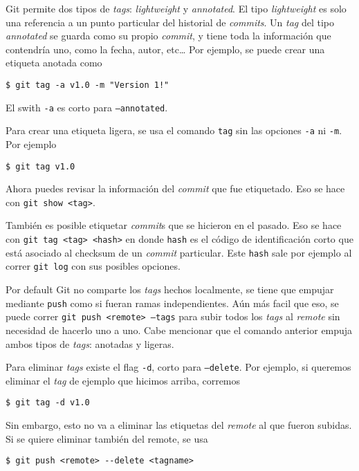 \documentclass[spanish, 12pt, a4paper]{article}
\begin{document}
Git permite dos tipos de \textit{tags}: \textit{lightweight} y
\textit{annotated}.
El tipo \textit{lightweight} es solo una referencia a un punto particular del
historial de \textit{commits}.
Un \textit{tag} del tipo \textit{annotated} se guarda como su propio
\textit{commit}, y tiene toda la información que contendría uno, como la fecha,
autor, etc\dots
Por ejemplo, se puede crear una etiqueta anotada como
\begin{lstlisting}
$ git tag -a v1.0 -m "Version 1!"
\end{lstlisting}
El swith \texttt{-a} es corto para \texttt{--annotated}.

Para crear una etiqueta ligera, se usa el comando \texttt{tag} sin las opciones
\texttt{-a} ni \texttt{-m}.
Por ejemplo
\begin{lstlisting}
$ git tag v1.0
\end{lstlisting}

Ahora puedes revisar la información del \textit{commit} que fue etiquetado.
Eso se hace con \texttt{git show <tag>}.

También es posible etiquetar \textit{commit}s que se hicieron en el pasado.
Eso se hace con \texttt{git tag <tag> <hash>} en donde \texttt{hash} es el
código de identificación corto que está asociado al checksum de un
\textit{commit} particular.
Este \texttt{hash} sale por ejemplo al correr \texttt{git log} con sus posibles
opciones.

Por default Git no comparte los \textit{tags} hechos localmente, se tiene que
empujar mediante \texttt{push} como si fueran ramas independientes.
Aún más facil que eso, se puede correr \texttt{git push <remote> --tags} para
subir todos los \textit{tags} al \textit{remote} sin necesidad de hacerlo uno a
uno.
Cabe mencionar que el comando anterior empuja ambos tipos de \textit{tags}:
anotadas y ligeras.

Para eliminar \textit{tags} existe el flag \texttt{-d}, corto para
\texttt{--delete}.
Por ejemplo, si queremos eliminar el \textit{tag} de ejemplo que hicimos arriba,
corremos
\begin{lstlisting}
$ git tag -d v1.0
\end{lstlisting}
Sin embargo, esto no va a eliminar las etiquetas del \textit{remote} al que
fueron subidas.
Si se quiere eliminar también del remote, se usa
\begin{lstlisting}
$ git push <remote> --delete <tagname>
\end{lstlisting}

\end{document}
